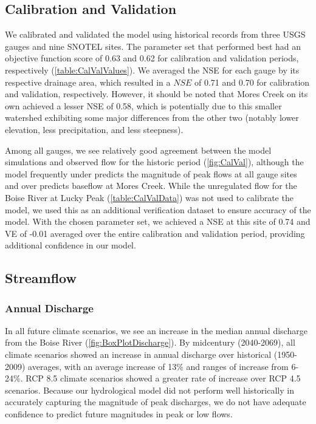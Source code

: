 \documentclass[11pt,letterpaper]{article}
\begin{document}
\subsection{Calibration and Validation}
We calibrated and validated the model using historical records from three USGS gauges and nine SNOTEL sites. The parameter set that performed best had an objective function score of 0.63 and 0.62 for calibration and validation periods, respectively (\cref{table:CalValValues}). We averaged the NSE for each gauge by its respective drainage area, which resulted in a $NSE$ of 0.71 and 0.70 for calibration and validation, respectively. However, it should be noted that Mores Creek on its own achieved a lesser NSE of 0.58, which is potentially due to this smaller watershed exhibiting some major differences from the other two (notably lower elevation, less precipitation, and less steepness).

Among all gauges, we see relatively good agreement between the model simulations and observed flow for the historic period (\cref{fig:CalVal}), although the model frequently under predicts the magnitude of peak flows at all gauge sites and over predicts baseflow at Mores Creek. While the unregulated flow for the Boise River at Lucky Peak (\cref{table:CalValData}) was not used to calibrate the model, we used this as an additional verification dataset to ensure accuracy of the model. With the chosen parameter set, we achieved a NSE at this site of 0.74 and VE of -0.01 averaged over the entire calibration and validation period, providing additional confidence in our model.

\subsection{Streamflow}

\subsubsection{Annual Discharge}

In all future climate scenarios, we see an increase in the median annual discharge from the Boise River (\cref{fig:BoxPlotDischarge}). By midcentury (2040-2069), all climate scenarios showed an increase in annual discharge over historical (1950-2009) averages, with an average increase of 13\% and ranges of increase from 6-24\%. RCP 8.5 climate scenarios showed a greater rate of increase over RCP 4.5 scenarios. Because our hydrological model did not perform well historically in accurately capturing the magnitude of peak discharges, we do not have adequate confidence to predict future magnitudes in peak or low flows. 
\end{document}

